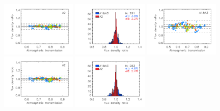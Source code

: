 \begin{figure}[ht!]
\begin{center}
    \includegraphics[clip=true, trim={0.9cm, 0.2cm, 0, 0.6cm}, width=0.32\textwidth]{Figures/Calibration/plot_flux_density_ratio_obstau_allbright_corrected_skydip_photocorr_demo_narrow_a2.pdf}
    \includegraphics[clip=true, trim={0.9cm, 0.2cm, 0, 0.6cm}, width=0.32\textwidth]{Figures/Calibration/plot_histo_flux_density_ratio_obstau_allbright_corrected_skydip_photocorr_demo_narrow_1n2mm.pdf}
    \includegraphics[clip=true, trim={0.9cm, 0.2cm, 0, 0.6cm}, width=0.32\textwidth]{Figures/Calibration/plot_flux_density_ratio_obstau_allbright_corrected_skydip_photocorr_pointing_narrow_1mm.pdf}
    \includegraphics[clip=true, trim={0.9cm, 0.2cm, 0, 0.6cm}, width=0.32\textwidth]{Figures/Calibration/plot_flux_density_ratio_obstau_allbright_corrected_skydip_photocorr_pointing_narrow_a2.pdf}
    \includegraphics[clip=true, trim={0.9cm, 0.2cm, 0, 0.6cm}, width=0.32\textwidth]{Figures/Calibration/plot_histo_flux_density_ratio_obstau_allbright_corrected_skydip_photocorr_pointing_narrow_1n2mm.pdf}

\end{center}
\end{figure}
